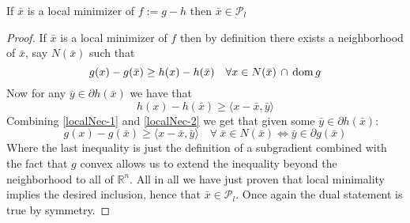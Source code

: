 \begin{theorem}
If $\bar x$ is a local minimizer of $f:=g-h$ then $\bar x \in \mathcal P_l$
\begin{proof}
If $\bar x$ is a local minimizer of $f$ then by definition there
exists a neighborhood of $\bar x$, say $N(\bar x)$ such
that 
%
\begin{equation}
	g(x)-g(\bar x) \geq h(x)-h(\bar x) \quad 
	\forall x\in N(\bar x) \, \cap \, \mathrm{dom} \, g
	\label{localNec-1}
\end{equation}
\noindent Now for any $\bar y \in\partial h(\bar x)$ we have that 
\begin{equation}
	h(x)-h(\bar x) \geq \langle x-\bar x, \bar y\rangle 
	\label{localNec-2}
\end{equation}
%
Combining \eqref{localNec-1} and \eqref{localNec-2} we get
that given some   $\bar y \in \partial h(\bar x)$:
%
\begin{equation}
	g(x)-g(\bar x)\geq \langle x-\bar x,\bar y\rangle \quad \forall \ 
	\bar x \in N(\bar x) \iff \bar y \in 
	\partial g(\bar x)
\end{equation}
%
Where the last inequality is just the definition of a subgradient combined
with the fact that $g$ convex allows us to extend the inequality beyond the
neighborhood to all of $\mathbb R^n$. All in all we have just proven 
that local minimality implies the desired inclusion, hence that
$\bar x \in \mathcal P_l$. Once again the dual statement is true by symmetry.
\end{proof}
\end{theorem}
\clearpage

